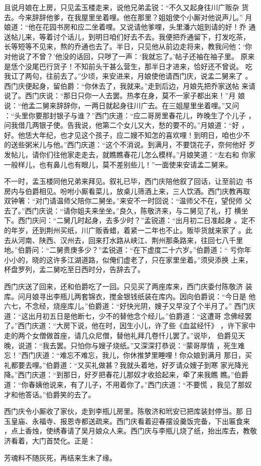 且说月娘在上房，只见孟玉楼走来，说他兄弟孟锐：“不久又起身往川广贩杂
货去。今来辞辞他爹，在我屋里坐着哩。他在那里？姐姐使个小厮对他说声儿。”
月娘道：“他在花园书房和应二坐着哩。又说请他爹哩，头里潘六姐到请的好！乔
通送帖儿来，等着讨个话儿，到明日咱们好去不去。我便把乔通留下，打发吃茶，
长等短等不见来，熬的乔通也去了。半日，只见他从前边走将来，教我问他：‘你
对他说了不曾？’他没的话回，只哕了一声：‘我就忘了。’帖子还袖在袖子里。
原来是恁个没尾巴行货子！不知前头干甚么营生，那半日才进来，恰好还不曾说。
吃我讧了两句，往前去了。”少顷，来安进来，月娘使他请西门庆，说孟二舅来了
。西门庆便起身，留伯爵：“你休去了，我就来。”走到后边，月娘先把乔家送帖
来请说了。西门庆说：“那日只你一人去罢。热孝在身，莫不一家子都出来！”月
娘说：“他孟二舅来辞辞你，一两日就起身往川广去。在三姐屋里坐着哩。”又问
：“头里你要那封银子与谁？”西门庆道：“应二哥房里春花儿，昨晚生了个儿子
，问我借几两银子使。告我说，他第二个女儿又大，愁的要不的。”月娘道：“好
，好。他恁大年纪，也才见这个孩子，应二嫂不知怎的喜欢哩！到明日，咱也少不
的送些粥米儿与他。”西门庆道：“这个不消说。到满月，不要饶花子，奈何他好
歹发帖儿，请你们往他家走走去，就瞧瞧春花儿怎么模样。”月娘笑道：“左右和
你家一般样儿，也有鼻儿也有眼儿，莫不差别些儿！”一面使来安请孟二舅来。

不一时，孟玉楼同他兄弟来拜见。叙礼已毕，西门庆陪他叙了回话，让至前边
书房内与伯爵相见。吩咐小厮看菜儿，放桌儿筛酒上来，三人饮酒。西门庆教再取
双钟箸：“对门请温师父陪你二舅坐。”来安不一时回说：“温师父不在，望倪师
父去了。”西门庆说：“请你姐夫来坐坐。”良久，陈敬济来，与二舅见了礼，打
横坐下。西门庆问：“二舅几时起身，去多少时？”孟锐道：“出月初二日准起身
。定不的年岁，还到荆州买纸，川广贩香蜡，着紧一二年也不止。贩毕货就来家了
。此去从河南、陕西、汉州去，回来打水路从峡江、荆州那条路来，往回七八千里
地。”伯爵问：“二舅贵庚多少？”孟锐道：“在下虚度二十六岁。”伯爵道：“
亏你年小小的，晓的这许多江湖道路，似俺们虚老了，只在家里坐着。”须臾添换
上来，杯盘罗列，孟二舅吃至日西时分，告辞去了。

西门庆送了回来，还和伯爵吃了一回。只见买了两座库来，西门庆委付陈敬济
装库。问月娘寻出李瓶儿两套锦衣，搅金银钱纸装在库内。因向伯爵说：“今日是
他六七，不念经，烧座库儿。”伯爵道：“好快光阴，嫂子又早没了个半月了。”
西门庆道：“这出月初五日是他断七，少不的替他念个经儿。”伯爵道：“这遭哥
念佛经罢了。”西门庆道：“大房下说，他在时，因生小儿，许了些《血盆经忏》
，许下家中走的两个女僧做首座，请几众尼僧，替他礼拜几卷忏儿罢了。”说毕，
伯爵见天晚，说道：“我去罢。只怕你与嫂子烧纸。”又深深打恭说：“蒙哥厚情
，死生难忘！”西门庆道：“难忘不难忘，我儿，你休推梦里睡哩！你众娘到满月
那日，买礼都要去哩。”伯爵道：“又买礼做甚？我就头着地，好歹请众嫂子到寒
家光降光降。”西门庆道：“到那日，好歹把春花儿那奴才收拾起来，牵了来我瞧
瞧。”伯爵道：“你春姨他说来，有了儿子，不用着你了。”西门庆道：“不要慌
，我见了那奴才和他答话。”伯爵笑的去了。

西门庆令小厮收了家伙，走到李瓶儿房里。陈敬济和玳安已把库装封停当。那
日玉皇庙、永福寺、报恩寺都送疏来。西门庆看着迎春摆设羹饭完备，下出匾食来
，点上香烛，使绣春请了吴月娘众人来。西门庆与李瓶儿烧了纸，抬出库去，教敬
济看着，大门首焚化。正是：

芳魂料不随灰死，再结来生未了缘。